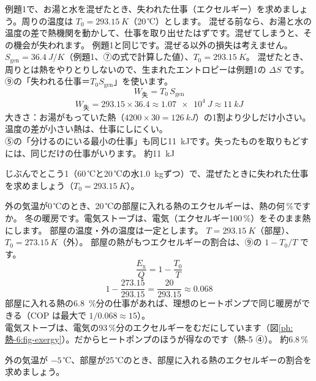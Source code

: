 \label{ph:熱-6:ex8}
\begin{phreidai}[混ぜると失われる仕事]
例題1で、お湯と水を混ぜたとき、失われた仕事（エクセルギー）を求めましょう。周りの温度は $T_0=\qty{293.15}{K}$（20\,℃）とします。
\phbamen
混ぜる前なら、お湯と水の温度の差で熱機関を動かして、仕事を取り出せたはずです。混ぜてしまうと、その機会が失われます。
\phmushi
例題1と同じです。混ぜる以外の損失は考えません。
\phzu
$S_{\mathrm{gen}}=\qty{36.4}{J/K}$（例題1、⑦の式で計算した値）、$T_0=\qty{293.15}{K}$。
\phriyu
混ぜたとき、周りとは熱をやりとりしないので、生まれたエントロピーは例題1の $\Delta S$ です。⑨の「失われる仕事＝$T_0S_{\mathrm{gen}}$」を使います。
\phtateru
\[W_{\text{失}}=T_0\,S_{\mathrm{gen}}\]
\phtoku
\[W_{\text{失}}=293.15\times36.4\approx\qty{1.07e4}{J}\approx\qty{11}{kJ}\]
\phtashikame
大きさ：お湯がもっていた熱（$4200\times30=\qty{126}{kJ}$）の1割より少しだけ小さい。温度の差が小さい熱は、仕事にしにくい。\\
⑤の「分けるのにいる最小の仕事」も同じ\qty{11}{kJ}です。失ったものを取りもどすには、同じだけの仕事がいります。
\kotae 約\qty{11}{kJ}
\end{phreidai}
\begin{jibun}
じぶんでとこう1（60\,℃と20\,℃の水\qty{1.0}{kg}ずつ）で、混ぜたときに失われた仕事を求めましょう（$T_0=\qty{293.15}{K}$）。
\end{jibun}

\label{ph:熱-6:ex9}
\begin{phreidai}
外の気温が0\,℃のとき、20\,℃の部屋に入れる熱のエクセルギーは、熱の何\,\%ですか。
\phbamen
冬の暖房です。電気ストーブは、電気（エクセルギー100\,\%）をそのまま熱にします。
\phmushi
部屋の温度・外の温度は一定とします。
\phzu
$T=\qty{293.15}{K}$（部屋）、$T_0=\qty{273.15}{K}$（外）。
\phriyu
部屋の熱がもつエクセルギーの割合は、⑨の $1-T_0/T$ です。
\phtateru
\[\frac{E_{\mathrm x}}{Q}=1-\frac{T_0}{T}\]
\phtoku
\[1-\frac{273.15}{293.15}=\frac{20}{293.15}\approx0.068\]
\phtashikame
部屋に入れる熱の\qty{6.8}{\%}分の仕事があれば、理想のヒートポンプで同じ暖房ができる（COP は最大で $1/0.068\approx15$）。\\
電気ストーブは、電気の93\,\%分のエクセルギーをむだにしています（図\ref{ph:熱-6:fig-exergy}）。だからヒートポンプのほうが得なのです（熱-5 ④）。
\kotae 約6.8\,\%
\end{phreidai}
\begin{jibun}
外の気温が $-5$\,℃、部屋が25\,℃のとき、部屋に入れる熱のエクセルギーの割合を求めましょう。
\end{jibun}

